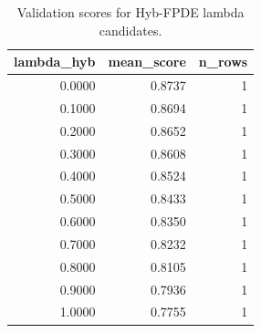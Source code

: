 \begin{table}[t]
\caption{Validation scores for Hyb-FPDE lambda candidates.}
\label{tab:lambda_distribution_computed}
\centering
\begin{tabular}{rrr}
\toprule
lambda\_hyb & mean\_score & n\_rows \\
\midrule
0.0000 & 0.8737 & 1 \\
0.1000 & 0.8694 & 1 \\
0.2000 & 0.8652 & 1 \\
0.3000 & 0.8608 & 1 \\
0.4000 & 0.8524 & 1 \\
0.5000 & 0.8433 & 1 \\
0.6000 & 0.8350 & 1 \\
0.7000 & 0.8232 & 1 \\
0.8000 & 0.8105 & 1 \\
0.9000 & 0.7936 & 1 \\
1.0000 & 0.7755 & 1 \\
\bottomrule
\end{tabular}

\end{table}
